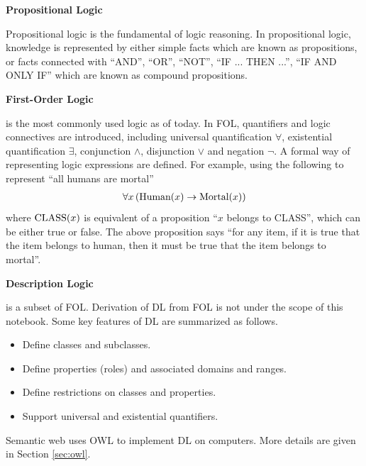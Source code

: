 \vspace{0.1in}
\noindent \textbf{Propositional Logic}
\vspace{0.1in}

Propositional logic is the fundamental of logic reasoning. In propositional logic, knowledge is represented by either simple facts which are known as propositions, or facts connected with ``AND'', ``OR'', ``NOT'', ``IF ... THEN ...'', ``IF AND ONLY IF'' which are known as compound propositions.

\vspace{0.1in}
\noindent \textbf{First-Order Logic}
\vspace{0.1in}

 is the most commonly used logic as of today. In FOL, quantifiers and logic connectives are introduced, including universal quantification $\forall$, existential quantification $\exists$, conjunction $\land$, disjunction $\lor$ and negation $\neg$. A formal way of representing logic expressions are defined. For example, using the following to represent ``all humans are mortal''
\begin{eqnarray}
	\forall x \left(\textup{Human}(x) \rightarrow \textup{Mortal}(x)\right) \nonumber
\end{eqnarray}
where $\textup{CLASS}(x)$ is equivalent of a proposition ``$x$ belongs to CLASS'', which can be either true or false. The above proposition says ``for any item, if it is true that the item belongs to human, then it must be true that the item belongs to mortal''.

\vspace{0.1in}
\noindent \textbf{Description Logic}
\vspace{0.1in}

 is a subset of FOL. Derivation of DL from FOL is not under the scope of this notebook. Some key features of DL are summarized as follows.
\begin{itemize}
	\item Define classes and subclasses.
	\item Define properties (roles) and associated domains and ranges.
	\item Define restrictions on classes and properties.
	\item Support universal and existential quantifiers.
\end{itemize}
Semantic web uses OWL to implement DL on computers. More details are given in Section \ref{sec:owl}.

